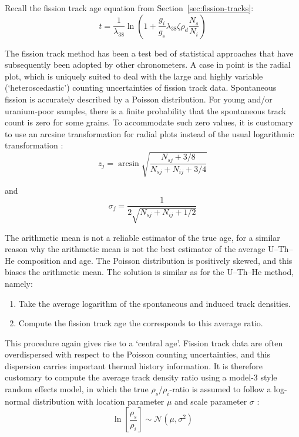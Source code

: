 \begin{refsection}
Recall the fission track age equation from
Section~\ref{sec:fission-tracks}:
\begin{equation}
t =
\frac{1}{\lambda_{38}}\ln\left(1+\frac{g_i}{g_s}
\lambda_{38}\zeta\rho_d\frac{N_s}{N_i}\right)
\label{eq:tzeta2}
\end{equation}

The fission track method has been a test bed of statistical approaches
that have subsequently been adopted by other chronometers. A case in
point is the radial plot, which is uniquely suited to deal with the
large and highly variable (`heteroscedastic') counting uncertainties
of fission track data. Spontaneous fission is accurately described by
a Poisson distribution. For young and/or uranium-poor samples, there
is a finite probability that the spontaneous track count is zero for
some grains.  To accommodate such zero values, it is customary to use
an arcsine transformation for radial plots instead of the usual
logarithmic transformation \citep{galbraith1990a}:
\begin{equation}
z_j = \arcsin\sqrt{\frac{N_{sj} + 3/8}{N_{sj}+N_{ij}+3/4}}
\label{eq:zj}
\end{equation}

\noindent and
\begin{equation}
\sigma_j = \frac{1}{2\sqrt{N_{sj}+N_{ij}+1/2}}
\label{eq:sj}
\end{equation}

The arithmetic mean is not a reliable estimator of the true age, for a
similar reason why the arithmetic mean is not the best estimator of
the average U--Th--He composition and age. The Poisson distribution is
positively skewed, and this biases the arithmetic mean. The solution
is similar as for the U--Th--He method, namely:

\begin{enumerate}
\item Take the average logarithm of the spontaneous and induced
  track densities.
\item Compute the fission track age the corresponds to this average
  ratio.
\end{enumerate}

This procedure again gives rise to a `central age'. Fission track data
are often overdispersed with respect to the Poisson counting
uncertainties, and this dispersion carries important thermal history
information. It is therefore customary to compute the average track
density ratio using a model-3 style random effects model, in which the
true $\rho_s/\rho_i$-ratio is assumed to follow a log-normal
distribution with location parameter $\mu$ and scale parameter
$\sigma$ \citep{galbraith1993}:
\begin{equation}
\ln\left[\frac{\rho_s}{\rho_i}\right] \sim \mathcal{N}(\mu,\sigma^2)
\label{eq:logrhosrhoi}
\end{equation}


\end{refsection}
